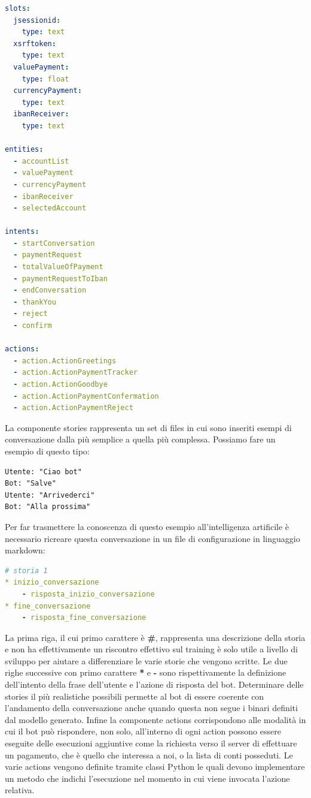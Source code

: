 \begin{lstlisting}[language=yaml,firstnumber=1]
slots:
  jsessionid:
    type: text
  xsrftoken:
    type: text
  valuePayment:
    type: float
  currencyPayment:
    type: text
  ibanReceiver:
    type: text

entities:
  - accountList
  - valuePayment
  - currencyPayment
  - ibanReceiver
  - selectedAccount

intents:
  - startConversation
  - paymentRequest
  - totalValueOfPayment
  - paymentRequestToIban
  - endConversation
  - thankYou
  - reject
  - confirm

actions:
  - action.ActionGreetings
  - action.ActionPaymentTracker
  - action.ActionGoodbye
  - action.ActionPaymentConfermation
  - action.ActionPaymentReject
\end{lstlisting}
La componente stories rappresenta un set di files in cui sono inseriti esempi di conversazione dalla più semplice a quella più complessa. Possiamo fare un esempio di questo tipo:
\begin{lstlisting}
Utente: "Ciao bot"
Bot: "Salve"
Utente: "Arrivederci"
Bot: "Alla prossima"
\end{lstlisting}
Per far trasmettere la conoscenza di questo esempio all'intelligenza artificile è necessario ricreare questa conversazione in un file di configurazione in linguaggio markdown:
\begin{lstlisting}[language=yaml]
# storia 1
* inizio_conversazione
    - risposta_inizio_conversazione
* fine_conversazione
    - risposta_fine_conversazione
\end{lstlisting}
La prima riga, il cui primo carattere è \textbf{\#}, rappresenta una descrizione della storia e non ha effettivamente un riscontro effettivo sul training è solo utile a livello di sviluppo per aiutare a differenziare le varie storie che vengono scritte.
Le due righe successive con primo carattere \textbf{*} e \textbf{-} sono rispettivamente la definizione dell'intento della frase dell'utente e l'azione di risposta del bot.
Determinare delle stories il più realistiche possibili permette al bot di essere coerente con l'andamento della conversazione anche quando questa non segue i binari definiti dal modello generato.
Infine la componente actions corrispondono alle modalità in cui il bot può rispondere, non solo, all'interno di ogni action possono essere eseguite delle esecuzioni aggiuntive come la richiesta verso il server di effettuare un pagamento, che è quello che interessa a noi, o la lista di conti posseduti.
Le varie actions vengono definite tramite classi Python le quali devono implementare un metodo che indichi l'esecuzione nel momento in cui viene invocata l'azione relativa.
